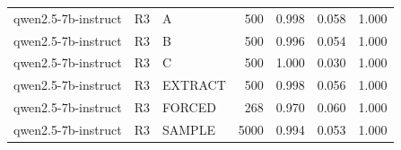 \begin{table}
\begin{tabular}{lllrrrr}
qwen2.5-7b-instruct & R3 & A & 500 & 0.998 & 0.058 & 1.000 \\
qwen2.5-7b-instruct & R3 & B & 500 & 0.996 & 0.054 & 1.000 \\
qwen2.5-7b-instruct & R3 & C & 500 & 1.000 & 0.030 & 1.000 \\
qwen2.5-7b-instruct & R3 & EXTRACT & 500 & 0.998 & 0.056 & 1.000 \\
qwen2.5-7b-instruct & R3 & FORCED & 268 & 0.970 & 0.060 & 1.000 \\
qwen2.5-7b-instruct & R3 & SAMPLE & 5000 & 0.994 & 0.053 & 1.000 \\
\bottomrule
\end{tabular}
\end{table}
